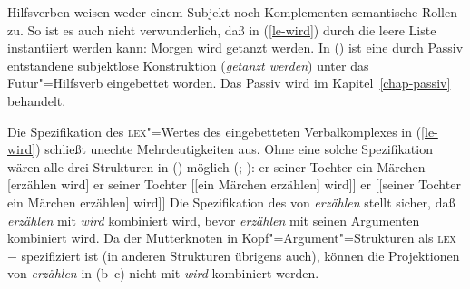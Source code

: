\noindent
Hilfsverben %
weisen weder einem Subjekt noch Komplementen semantische Rollen zu.
So ist es auch nicht verwunderlich, daß
 in (\ref{le-wird}) durch die leere Liste instantiiert werden kann:
\ea
Morgen wird getanzt werden.
\z
In () ist eine durch Passiv entstandene subjektlose Konstruktion (\emph{getanzt werden})
unter das Futur"=Hilfsverb eingebettet worden. Das Passiv wird im Kapitel~\ref{chap-passiv}
behandelt.

Die Spezifikation des \textsc{lex}"=Wertes des eingebetteten Verbalkomplexes in (\ref{le-wird})
schließt unechte Mehrdeutigkeiten aus.
Ohne eine solche Spezifikation wären alle drei Strukturen in () möglich (\citealp[]{Pollard90a};
\citealp{HN94b}):
\eal
\ex er seiner Tochter  ein Märchen [erzählen wird]
\ex er seiner Tochter [[ein Märchen erzählen] wird]]\label{pvp-ein-maerchen-erzaehlen}
\ex er [[seiner Tochter ein Märchen erzählen] wird]]
\zl
Die Spezifikation des \lexwes von \emph{erzählen} stellt sicher, daß \emph{erzählen} mit \emph{wird} kombiniert wird,
bevor \emph{erzählen} mit seinen Argumenten kombiniert wird. Da der Mutterknoten in
Kopf"=Argument"=Strukturen als \textsc{lex}$-$ spezifiziert ist (in anderen Strukturen übrigens auch), 
können die Projektionen
von \emph{erzählen} in (b--c) nicht mit \emph{wird} kombiniert werden.

